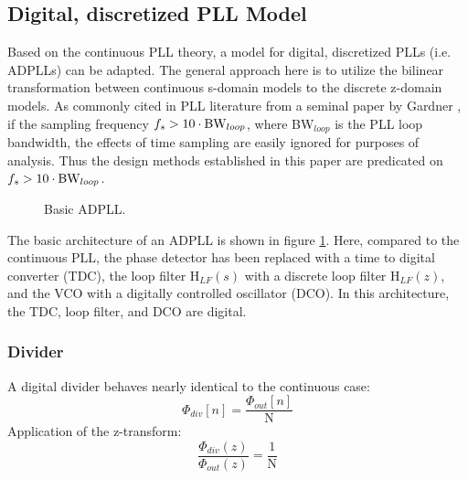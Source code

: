 \subsection{Digital, discretized PLL Model}
Based on the continuous PLL theory, a model for digital, discretized PLLs (i.e. ADPLLs) can be adapted. The general approach here is to utilize the bilinear transformation between continuous s-domain models to the discrete z-domain models. As commonly cited in PLL literature from a seminal paper by Gardner \cite{gardner_1980}, if the sampling frequency $f_s > 10\cdot\textnormal{BW}_{loop}$, where BW$_{loop}$ is the PLL loop bandwidth, the effects of time sampling are easily ignored for purposes of analysis. Thus the design methods established in this paper are predicated on $f_s > 10\cdot\textnormal{BW}_{loop}$.
\begin{figure}[htb!]
	\center
	\caption{Basic ADPLL.}
	\label{fig:basic_adpll}
\end{figure}
\FloatBarrier
The basic architecture of an ADPLL is shown in figure \ref{fig:basic_adpll}. Here, compared to the continuous PLL, the phase detector has been replaced with a time to digital converter (TDC), the loop filter $\mathrm{H}_{LF}(s)$ with a discrete loop filter $\mathrm{H}_{LF}(z)$, and the VCO with a digitally controlled oscillator (DCO). In this architecture, the TDC, loop filter, and DCO are digital. 

\subsubsection{Divider}
A digital divider behaves nearly identical to the continuous case:
\begin{equation}
	\Phi_{div}[n] = \frac{\Phi_{out}[n]}{\mathrm{N}}
\end{equation}
Application of the z-transform:
\begin{equation}
	\frac{\Phi_{div}(z)}{\Phi_{out}(z)} = \frac{1}{\mathrm{N}}
\end{equation}
